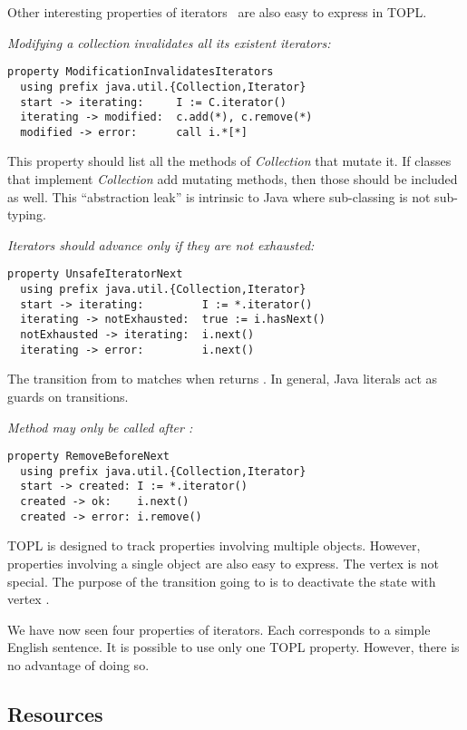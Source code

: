 \documentclass[preprint]{sigplanconf} %
\newcommand{\delimitVerbatim}{\par\nobreak\smallskip\noindent}
\theoremstyle{definition}
\theoremstyle{remark}
\begin{document}
Other interesting properties of iterators~\cite{dblp:conf/oopsla/naeeml08,dblp:conf/sigsoft/boddenlh08,haack2009} are also easy to express in TOPL\null.

\medskip\emph{Modifying a collection invalidates all its existent iterators:}
\delimitVerbatim
\begin{Verbatim}
property ModificationInvalidatesIterators
  using prefix java.util.{Collection,Iterator}
  start -> iterating:     I := C.iterator()
  iterating -> modified:  c.add(*), c.remove(*)
  modified -> error:      call i.*[*]
\end{Verbatim}
\delimitVerbatim
This property should list all the methods of \textit{Collection} that mutate it.
If classes that implement \textit{Collection} add mutating methods, then those should be included as well.
This ``abstraction leak'' is intrinsic to Java where sub-classing is not sub-typing.

\medskip\emph{Iterators should advance only if they are not exhausted:}
\delimitVerbatim
\begin{Verbatim}
property UnsafeIteratorNext
  using prefix java.util.{Collection,Iterator}
  start -> iterating:         I := *.iterator()
  iterating -> notExhausted:  true := i.hasNext()
  notExhausted -> iterating:  i.next()
  iterating -> error:         i.next()
\end{Verbatim}
\delimitVerbatim
The transition from \Verb@iterating@ to \Verb@notExhausted@ matches when \Verb@hasNext@ returns \Verb@true@.
In general, Java literals act as guards on transitions.

\medskip\emph{Method \Verb@remove@ may only be called after \Verb@next@:}
\delimitVerbatim
\begin{Verbatim}
property RemoveBeforeNext
  using prefix java.util.{Collection,Iterator}
  start -> created: I := *.iterator()
  created -> ok:    i.next()
  created -> error: i.remove()
\end{Verbatim}
\delimitVerbatim
TOPL is designed to track properties involving multiple objects.
However, properties involving a single object are also easy to express.
The vertex \Verb@ok@ is not special.
The purpose of the transition going to \Verb@ok@ is to deactivate the state with vertex \Verb@created@.

\medskip
We have now seen four properties of iterators.
Each corresponds to a simple English sentence.
It is possible to use only one TOPL property.
However, there is no advantage of doing so.

\subsection{Resources} %
\end{document}
